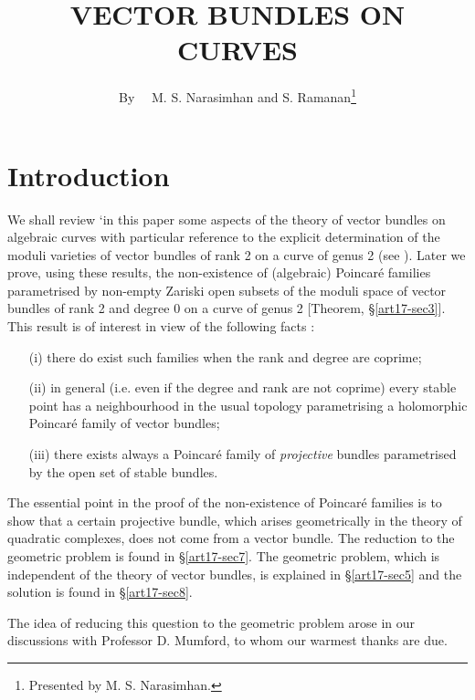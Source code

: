 \title{VECTOR BUNDLES ON CURVES}

\author{By~~ M. S. Narasimhan and S. Ramanan\footnote{Presented by M. S. Narasimhan.}}
\date{}

\maketitle


\setcounter{pageoriginal}{334}
\section{Introduction}\label{art17-sec1}
\pageoriginale

We shall review `in this paper some aspects of the theory of vector bundles on algebraic curves with particular reference to the explicit determination of the moduli varieties of vector bundles of rank 2 on a curve of genus 2 (see \cite{art17-key3}). Later we prove, using these results, the non-existence of (algebraic) Poincar\'e families parametrised by non-empty Zariski open subsets of the moduli space of vector bundles of rank 2 and degree 0 on a curve of genus 2 [Theorem, \S\ref{art17-sec3}]. This result is of interest in view of the following facts :
\begin{itemize}
\item[(i)] there do exist such families when the rank and degree are coprime;

\item[(ii)] in general (i.e. even if the degree and rank are not coprime) every stable point has a neighbourhood in the usual topology parametrising a holomorphic Poincar\'e family of vector bundles;

\item[(iii)] there exists always a Poincar\'e family of {\em projective} bundles parametrised by the open set of stable bundles.
\end{itemize}

The essential point in the proof of the non-existence of Poincar\'e families is to show that a certain projective bundle, which arises geometrically in the theory of quadratic complexes, does not come from a vector bundle. The reduction to the geometric problem is found in \S\ref{art17-sec7}. The geometric problem, which is independent of the theory of vector bundles, is explained in \S\ref{art17-sec5} and the solution is found in \S\ref{art17-sec8}.

The idea of reducing this question to the geometric problem arose in our discussions with Professor D. Mumford, to whom our warmest thanks are due.

